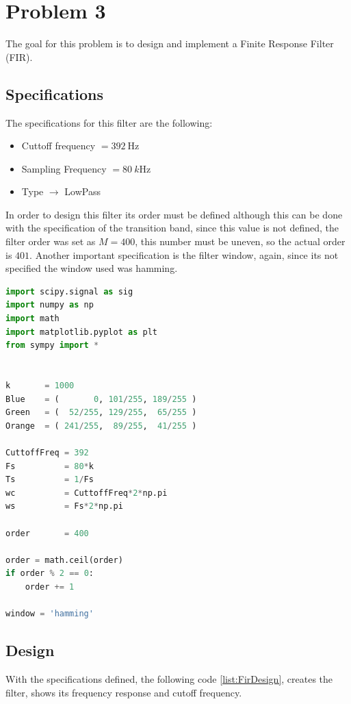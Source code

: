 \section{Problem 3}

The goal for this problem is to design and implement a Finite Response Filter (FIR).

\subsection{Specifications}

The specifications for this filter are the following:
\begin{itemize}
    \item Cuttoff frequency  $= 392~\si{\Hz}$
    \item Sampling Frequency $= 80~k\si{\Hz}$
    \item Type $\rightarrow$ LowPass
\end{itemize}

In order to design this filter its order must be defined although this can be done with the specification of the transition band, since this value is not defined, the filter order was set as $M = 400$, this number must be uneven, so the actual order is $401$. Another important specification is the filter window, again, since its not specified the window used was hamming.
\vspace{1cm}
\begin{lstlisting}[language=python, caption = Specification Definition]
import scipy.signal as sig
import numpy as np
import math
import matplotlib.pyplot as plt 
from sympy import *


k       = 1000
Blue    = (       0, 101/255, 189/255 )
Green   = (  52/255, 129/255,  65/255 )
Orange  = ( 241/255,  89/255,  41/255 )

CuttoffFreq = 392
Fs          = 80*k
Ts          = 1/Fs
wc          = CuttoffFreq*2*np.pi
ws          = Fs*2*np.pi 

order       = 400

order = math.ceil(order)
if order % 2 == 0:
    order += 1

window = 'hamming'
\end{lstlisting}

\subsection{Design}

With the specifications defined, the following code \ref{list:FirDesign}, creates the filter, shows its frequency response and cutoff frequency.

